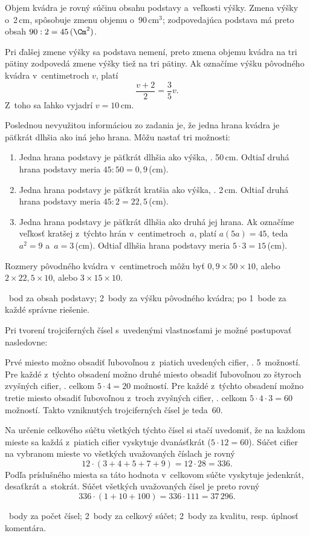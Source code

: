 {%
Objem kvádra je rovný súčinu obsahu podstavy a~veľkosti výšky.
Zmena výšky o~2\,cm, spôsobuje zmenu objemu o~90\,cm$^3$; zodpovedajúca podstava má preto obsah $90:2=45\,(\Cm^2)$.

Pri ďalšej zmene výšky sa podstava nemení, preto zmena objemu kvádra na tri pätiny zodpovedá zmene výšky tiež na tri pätiny.
Ak označíme výšku pôvodného kvádra v~centimetroch $v$, platí
$$
\frac{v+2}{2}=\frac{3}{5}v.
$$
Z~toho sa ľahko vyjadrí $v=10$\,cm.

Poslednou nevyužitou informáciou zo zadania je, že jedna hrana kvádra je päťkrát dlhšia ako iná jeho hrana.
Môžu nastať tri možnosti:
\begin{enumerate}\alphatrue
\item Jedna hrana podstavy je päťkrát dlhšia ako výška, \tj. 50\,cm.
Odtiaľ druhá hrana podstavy meria $45:50=0{,}9$\,(cm).
\item Jedna hrana podstavy je päťkrát kratšia ako výška, \tj. 2\,cm.
Odtiaľ druhá hrana podstavy meria $45:2=22{,}5$\,(cm).
\item Jedna hrana podstavy je päťkrát dlhšia ako druhá jej hrana.
Ak označíme veľkosť kratšej z~týchto hrán v~centimetroch~$a$, platí
$a(5a)=45$, teda $a^2=9$ a~$a=3$\,(cm).
Odtiaľ dlhšia hrana podstavy meria $5\cdot 3=15$\,(cm).
\end{enumerate}

Rozmery pôvodného kvádra v~centimetroch môžu byť
$0{,}9\times 50\times10$, alebo ${2\times 22{,}5\times 10}$, alebo $3\times 15\times 10$.

~bod za obsah podstavy;
2~body za výšku pôvodného kvádra;
po 1~bode za každé správne riešenie.
\endhodnotenie
}

{%
Pri tvorení trojciferných čísel s~uvedenými vlastnosťami je možné postupovať nasledovne:

Prvé miesto možno obsadiť ľubovoľnou z~piatich uvedených cifier, \tj. 5~možností.
Pre každé z~týchto obsadení možno druhé miesto obsadiť ľubovoľnou zo štyroch zvyšných cifier, \tj. celkom $5\cdot4=20$ možností.
Pre každé z~týchto obsadení možno tretie miesto obsadiť ľubovoľnou z~troch zvyšných cifier, \tj. celkom $5\cdot4\cdot3=60$ možností.
Takto vzniknutých trojciferných čísel je teda~60.

Na určenie celkového súčtu všetkých týchto čísel si stačí uvedomiť, že na každom mieste sa každá z~piatich cifier vyskytuje dvanásťkrát ($5\cdot 12=60$).
Súčet cifier na vybranom mieste vo všetkých uvažovaných číslach je rovný
$$
12\cdot(3+4+5+7+9)=12\cdot 28=336.
$$
Podľa príslušného miesta sa táto hodnota v~celkovom súčte vyskytuje jedenkrát, desaťkrát a~stokrát.
Súčet všetkých uvažovaných čísel je preto rovný
$$
336\cdot(1+10+100)=336\cdot 111=37\,296.
$$

~body za počet čísel;
2~body za celkový súčet;
2~body za kvalitu, resp. úplnosť komentára.
\endhodnotenie}

